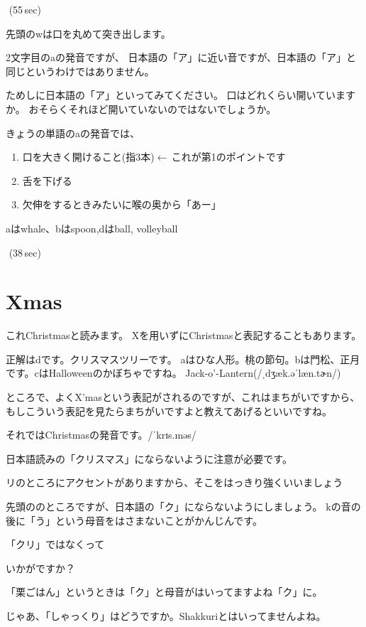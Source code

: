 \documentclass[12pt]{jlreq}
\let\textipa\undefined
\begin{document}
\faVolumeUp\,\,(55\,sec)

先頭のwは口を丸めて突き出します。

2文字目のaの発音ですが、
日本語の「ア」に近い音ですが、日本語の「ア」と同じというわけではありません。

ためしに日本語の「ア」といってみてください。
口はどれくらい開いていますか。
おそらくそれほど開いていないのではないでしょうか。

きょうの単語のaの発音では、
\begin{enumerate}
 \item 口を大きく開けること(指3本)$\leftarrow$\,これが第1のポイントです
 \item 舌を下げる
 \item 欠伸をするときみたいに喉の奥から「あー」
\end{enumerate}

aはwhale、bはspoon,dはball, volleyball

\faVolumeUp\,\,(38\,sec)
\newpage
\section{Xmas}

これChristmasと読みます。
Xを用いずにChristmasと表記することもあります。

正解はdです。クリスマスツリーです。
aはひな人形。桃の節句。bは門松、正月です。cはHalloweenのかぼちゃですね。
Jack-o'-Lantern(/ˌdʒæk.əˈlæn.tɚn/)

ところで、よくX'masという表記がされるのですが、これはまちがいですから、もしこういう表記を見たらまちがいですよと教えてあげるといいですね。

それではChristmasの発音です。/ˈkrɪs.məs/

日本語読みの「クリスマス」にならないように注意が必要です。

リのところにアクセントがありますから、そこをはっきり強くいいましょう

先頭の\textipa{/krI/}のところですが、日本語の「ク」にならないようにしましょう。
kの音の後に「う」という母音をはさまないことがかんじんです。

「クリ」ではなくって\textipa{/kr\textsci /}

いかがですか？

「栗ごはん」というときは「ク」と母音がはいってますよね「ク」に。

じゃあ、「しゃっくり」はどうですか。Shakkuriとはいってませんよね。

\newpage
\end{document}
